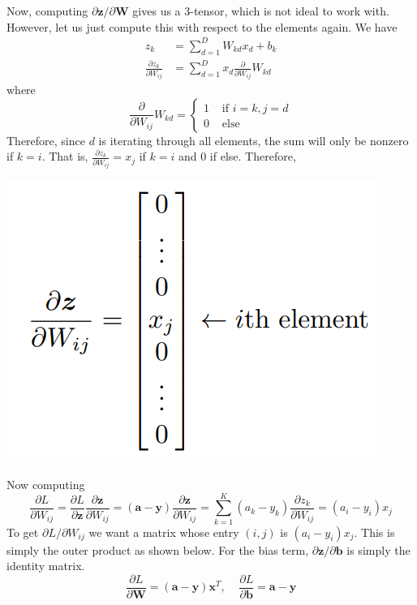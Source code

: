\documentclass{article}
\theoremstyle{definition}
\begin{document}
  Now, computing $\partial \mathbf{z} / \partial \mathbf{W}$ gives us a $3$-tensor, which is not ideal to work with. However, let us just compute this with respect to the elements again. We have 
  \begin{align*}
      z_k & = \sum_{d=1}^D W_{kd} x_d + b_k \\ 
      \frac{\partial z_k}{\partial W_{ij}} & = \sum_{d=1}^D x_d \frac{\partial}{\partial W_{ij}} W_{kd}
  \end{align*}
  where 
  \[\frac{\partial}{\partial W_{ij}} W_{kd} = \begin{cases} 1 & \text{ if } i = k, j = d \\ 0 & \text{ else} \end{cases}\]
  Therefore, since $d$ is iterating through all elements, the sum will only be nonzero if $k = i$. That is, $\frac{\partial z_k}{\partial W_{ij}} = x_j$ if $k = i$ and $0$ if else. Therefore, 
  \begin{center}
      \includegraphics[scale=0.3]{img/softmax_deriv.png}
  \end{center}
  Now computing 
  \[\frac{\partial L}{\partial W_{ij}} = \frac{\partial L}{\partial \mathbf{z}} \frac{\partial \mathbf{z}}{\partial W_{ij}} = (\mathbf{a} - \mathbf{y}) \frac{\partial \mathbf{z}}{\partial W_{ij}} = \sum_{k=1}^K (a_k - y_k) \frac{\partial z_k}{\partial W_{ij}} = (a_i - y_i) x_j\]
  To get $\partial L / \partial W_{ij}$ we want a matrix whose entry $(i, j)$ is $(a_i - y_i) x_j$. This is simply the outer product as shown below. For the bias term, $\partial \mathbf{z} / \partial \mathbf{b}$ is simply the identity matrix. 
  \[\frac{\partial L}{\partial \mathbf{W}} = (\mathbf{a} - \mathbf{y}) \mathbf{x}^T, \;\;\;\; \frac{\partial L}{\partial \mathbf{b}} = \mathbf{a} - \mathbf{y}\]
\end{document}
